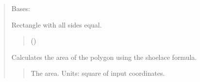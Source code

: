 \documentclass[letterpaper,10pt,english]{sphinxmanual}
\begin{document}
\begin{quote}
\begin{fulllineitems}
\begin{quote}
\begin{description}
\begin{itemize}
\end{itemize}

\end{description}\end{quote}

\end{fulllineitems}


\begin{fulllineitems}
\label{\detokenize{pygeox:pygeox.custom_objects.Square}}
\pysigstartsignatures
\pysiglinewithargsret
{}
{\sphinxparamcomma {}\sphinxparamcomma {}\sphinxparamcomma {}\sphinxparamcomma {}\sphinxparamcomma {}\sphinxparamcomma {}\sphinxparamcomma {}}
{}
\pysigstopsignatures
\sphinxAtStartPar
Bases: 

\sphinxAtStartPar
Rectangle with all sides equal.
\begin{quote}\begin{description}
\sphinxAtStartPar
{} ()

\end{description}\end{quote}

\begin{fulllineitems}
\label{\detokenize{pygeox:pygeox.custom_objects.Square.area}}
\pysigstartsignatures
\pysigline
{}
\pysigstopsignatures
\sphinxAtStartPar
Calculates the area of the polygon using the shoelace formula.
\begin{quote}\begin{description}
\sphinxAtStartPar
The area. Units: square of input coordinates.


\end{description}
\end{quote}
\end{fulllineitems}
\end{fulllineitems}
\end{quote}
\end{document}
